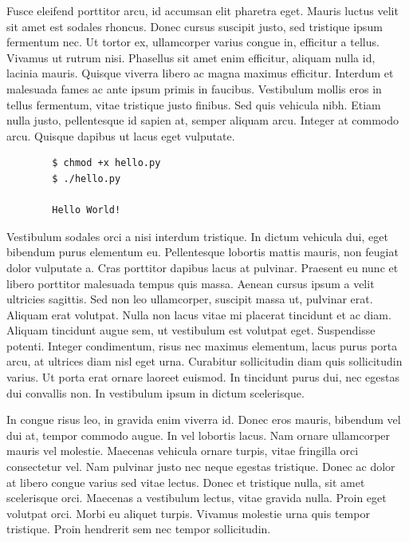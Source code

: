 \documentclass{article}
\begin{document}
Fusce eleifend porttitor arcu, id accumsan elit pharetra eget. Mauris luctus velit sit amet est sodales rhoncus. Donec cursus suscipit justo, sed tristique ipsum fermentum nec. Ut tortor ex, ullamcorper varius congue in, efficitur a tellus. Vivamus ut rutrum nisi. Phasellus sit amet enim efficitur, aliquam nulla id, lacinia mauris. Quisque viverra libero ac magna maximus efficitur. Interdum et malesuada fames ac ante ipsum primis in faucibus. Vestibulum mollis eros in tellus fermentum, vitae tristique justo finibus. Sed quis vehicula nibh. Etiam nulla justo, pellentesque id sapien at, semper aliquam arcu. Integer at commodo arcu. Quisque dapibus ut lacus eget vulputate.

\begin{commandline}
	\begin{verbatim}
		$ chmod +x hello.py
		$ ./hello.py

		Hello World!
	\end{verbatim}
\end{commandline}

Vestibulum sodales orci a nisi interdum tristique. In dictum vehicula dui, eget bibendum purus elementum eu. Pellentesque lobortis mattis mauris, non feugiat dolor vulputate a. Cras porttitor dapibus lacus at pulvinar. Praesent eu nunc et libero porttitor malesuada tempus quis massa. Aenean cursus ipsum a velit ultricies sagittis. Sed non leo ullamcorper, suscipit massa ut, pulvinar erat. Aliquam erat volutpat. Nulla non lacus vitae mi placerat tincidunt et ac diam. Aliquam tincidunt augue sem, ut vestibulum est volutpat eget. Suspendisse potenti. Integer condimentum, risus nec maximus elementum, lacus purus porta arcu, at ultrices diam nisl eget urna. Curabitur sollicitudin diam quis sollicitudin varius. Ut porta erat ornare laoreet euismod. In tincidunt purus dui, nec egestas dui convallis non. In vestibulum ipsum in dictum scelerisque.

\begin{warn}[Notice:]
  In congue risus leo, in gravida enim viverra id. Donec eros mauris, bibendum vel dui at, tempor commodo augue. In vel lobortis lacus. Nam ornare ullamcorper mauris vel molestie. Maecenas vehicula ornare turpis, vitae fringilla orci consectetur vel. Nam pulvinar justo nec neque egestas tristique. Donec ac dolor at libero congue varius sed vitae lectus. Donec et tristique nulla, sit amet scelerisque orci. Maecenas a vestibulum lectus, vitae gravida nulla. Proin eget volutpat orci. Morbi eu aliquet turpis. Vivamus molestie urna quis tempor tristique. Proin hendrerit sem nec tempor sollicitudin.
\end{warn}

\end{document}

